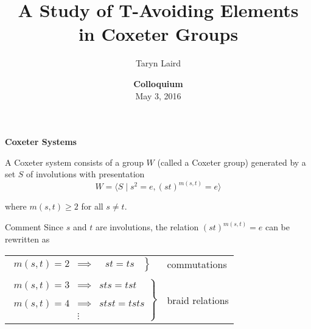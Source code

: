 \documentclass{beamer}
\begin{document}
\def\newblock{\hskip .11em plus .33em minus .07em}

\title[A Study of T-Avoiding Elements in Coxeter Groups]
{\textbf{A Study of T-Avoiding Elements\\ in Coxeter Groups}}
\author[T.M.~Laird]{Taryn Laird}

\vspace{1em}

\date[NAU]{\textbf{Colloquium}\\
May 3, 2016}

\frame{\titlepage}




\begin{frame}{\textbf{Coxeter Systems}}

\begin{definition}
A \alert{Coxeter system} consists of a group $W$ (called a \alert{Coxeter group}) generated by a set $S$ of involutions with presentation
\[ W=\langle S \mid s^2=e, (st)^{m(s,t)}=e \rangle \]

where $m(s,t) \geq 2$ for all $s \neq t$.
\end{definition}

\pause

\begin{block}{Comment}
Since $s$ and $t$ are involutions, the relation $(st)^{m(s,t)}=e$ can be 
rewritten as

\begin{center}
\begin{tabular}{ll}
$\left.\begin{array}{lcc}m(s,t)=2 & \implies &\ \ \, st=ts\ \   \end
{array}\right\}$&  \alert{commutations}\\
\\\pause
$\left.\begin{array}{lcc}m(s,t)=3 & \implies & sts=tst \\
& & \\
m(s,t)=4 & \implies & stst=tsts \\
 & \vdots &  \end{array}\right\}$ &\alert{braid relations}
\end{tabular}
\end{center}
\end{block}
\end{frame}
\end{document}
